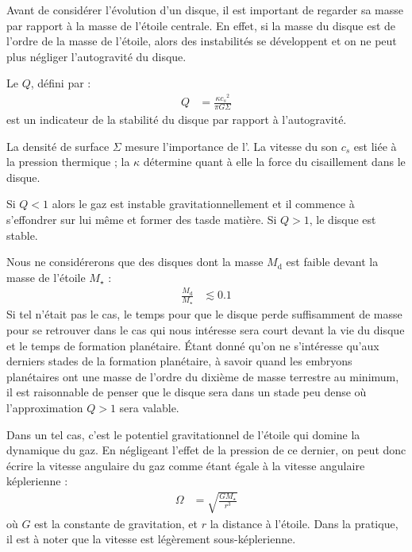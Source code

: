 Avant de considérer l'évolution d'un disque, il est important de regarder sa masse par rapport à la masse de l'étoile centrale. En effet, si la masse du disque est de l'ordre de la masse de l'étoile, alors des instabilités se développent et on ne peut plus négliger l'autogravité du disque. 

Le  $Q$, défini par :
\begin{align}
Q &= \frac{\kappa {c_{s}}^2}{\pi G \Sigma}
\end{align}
est un indicateur de la stabilité du disque par rapport à l'autogravité.

La densité de surface $\Sigma$\index{$\Sigma$} mesure l'importance de l'. La vitesse du son $c_{s}$ est liée à la pression thermique ; la  $\kappa$ détermine quant à elle la force du cisaillement dans le disque.

\bigskip

Si $Q<1$ alors le gaz est instable gravitationnellement et il commence à s'effondrer sur lui même et former des \og tas\fg de matière.
Si $Q>1$, le disque est stable.


Nous ne considérerons que des disques dont la masse $M_\text{d}$ est faible devant la masse de l'étoile $M_\star$ :
\begin{align}
\frac{M_\text{d}}{M_\star} &\lesssim 0.1
\end{align}
Si tel n'était pas le cas, le temps pour que le disque perde suffisamment de masse pour se retrouver dans le cas qui nous intéresse sera court devant la vie du disque et le temps de formation planétaire. Étant donné qu'on ne s'intéresse qu'aux derniers stades de la formation planétaire, à savoir quand les embryons planétaires ont une masse de l'ordre du dixième de masse terrestre au minimum, il est raisonnable de penser que le disque sera dans un stade peu dense où l'approximation $Q>1$ sera valable.

Dans un tel cas, c'est le potentiel gravitationnel de l'étoile qui domine la dynamique du gaz. En négligeant l'effet de la pression de ce dernier, on peut donc écrire la vitesse angulaire du gaz comme étant égale à la vitesse angulaire képlerienne : 
\begin{align}
\Omega &= \sqrt{\frac{GM_\star}{r^3}}
\end{align}
où $G$ est la constante de gravitation, et $r$ la distance à l'étoile. Dans la pratique, il est à noter que la vitesse est légèrement sous-képlerienne. 


